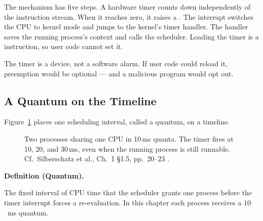 \documentclass[11pt]{article}
\newenvironment{definitionbox}[1]{%
  \par\noindent\textbf{Definition (#1).}\ \itshape
}{\par\vspace{0.3em}}
\begin{document}
The mechanism has five steps. A hardware timer counts down independently of
the instruction stream. When it reaches zero, it raises a .
The interrupt switches the CPU to kernel mode and jumps to the kernel's timer
handler. The handler saves the running process's context and calls the
scheduler. Loading the timer is a  instruction, so user code
cannot set it.

The timer is a device, not a software alarm. If user code could reload it,
preemption would be optional --- and a malicious program would opt out.

\subsection{A Quantum on the Timeline}

Figure~\ref{fig:quantum} places one scheduling interval, called a quantum, on a
timeline.

\begin{figure}[h]
  \centering
  \caption{Two processes sharing one CPU in 10\,ms quanta. The timer fires at
  10, 20, and 30\,ms, even when the running process is still runnable. Cf.\
  Silberschatz et al., Ch.~1 \S1.5, pp.~20--23
  \cite{SilberschatzOSC_operating_system_concepts}.}
  \label{fig:quantum}
\end{figure}

\begin{definitionbox}{Quantum}
The fixed interval of CPU time that the scheduler grants one process before the
timer interrupt forces a re-evaluation. In this chapter each process receives a
$10$~ms quantum.
\end{definitionbox}
\end{document}
